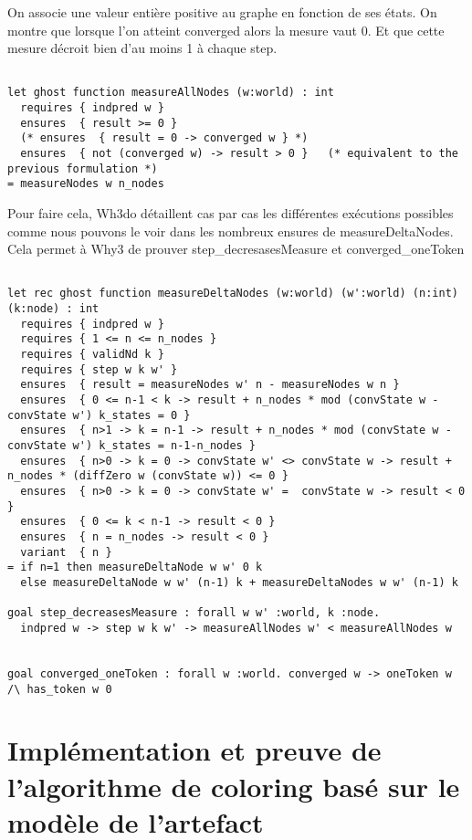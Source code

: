 \documentclass[11pt]{article}
\begin{document}
On associe une valeur entière positive au graphe en fonction de ses états.
On montre que lorsque l'on atteint converged alors la mesure vaut 0. 
Et que cette mesure décroit bien d'au moins 1 à chaque step. 


\begin{verbatim}

let ghost function measureAllNodes (w:world) : int
  requires { indpred w }
  ensures  { result >= 0 }
  (* ensures  { result = 0 -> converged w } *)
  ensures  { not (converged w) -> result > 0 }   (* equivalent to the previous formulation *)
= measureNodes w n_nodes

\end{verbatim}

Pour faire cela, Wh3do détaillent cas par cas les différentes exécutions possibles  comme nous
pouvons le voir dans les nombreux ensures de measureDeltaNodes. 
Cela permet à Why3 de prouver step\_decresasesMeasure et converged\_oneToken

\begin{verbatim}

let rec ghost function measureDeltaNodes (w:world) (w':world) (n:int) (k:node) : int
  requires { indpred w }
  requires { 1 <= n <= n_nodes }
  requires { validNd k }
  requires { step w k w' }
  ensures  { result = measureNodes w' n - measureNodes w n }
  ensures  { 0 <= n-1 < k -> result + n_nodes * mod (convState w - convState w') k_states = 0 }
  ensures  { n>1 -> k = n-1 -> result + n_nodes * mod (convState w - convState w') k_states = n-1-n_nodes }
  ensures  { n>0 -> k = 0 -> convState w' <> convState w -> result + n_nodes * (diffZero w (convState w)) <= 0 }
  ensures  { n>0 -> k = 0 -> convState w' =  convState w -> result < 0 }
  ensures  { 0 <= k < n-1 -> result < 0 }
  ensures  { n = n_nodes -> result < 0 }
  variant  { n }
= if n=1 then measureDeltaNode w w' 0 k
  else measureDeltaNode w w' (n-1) k + measureDeltaNodes w w' (n-1) k

goal step_decreasesMeasure : forall w w' :world, k :node.
  indpred w -> step w k w' -> measureAllNodes w' < measureAllNodes w


goal converged_oneToken : forall w :world. converged w -> oneToken w /\ has_token w 0

\end{verbatim}

\section{Implémentation et preuve de l’algorithme de coloring basé sur le modèle de l'artefact}
\label{sec:org9a4e85f}
\end{document}
